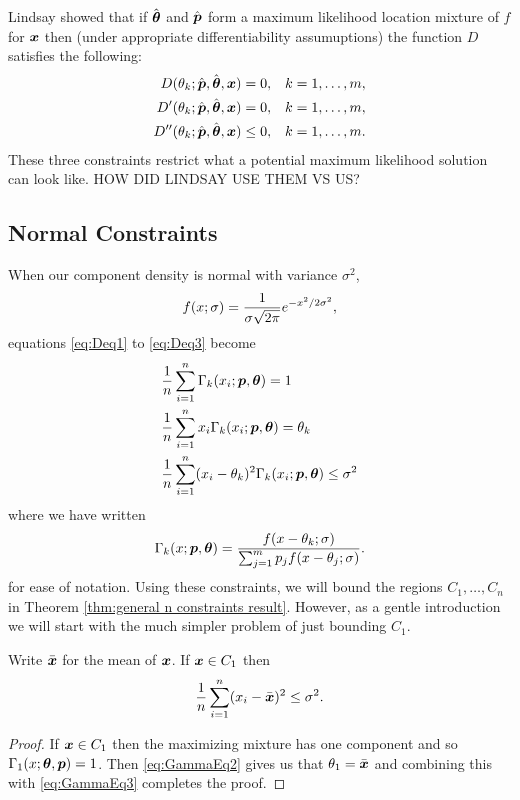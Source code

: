 		Lindsay showed that if $\hat{{\bm{{\theta}}}}$ and $\hat{{\bm{{p}}}}$ form a maximum likelihood location mixture of $f$ for ${\bm{{x}}}$ then (under appropriate differentiability assumuptions) the function $D$ satisfies the following:
		\begin{align}
			D(\theta_k;\hat{{\bm{{p}}}},\hat{{\bm{{\theta}}}},{\bm{{x}}}) &= 0, && k = 1,\dots,m,
			\label{eq:Deq1}\\
			D'(\theta_k;\hat{{\bm{{p}}}},\hat{{\bm{{\theta}}}},{\bm{{x}}}) &= 0, && k = 1,\dots,m,
			\label{eq:Deq2}\\
			D''(\theta_k;\hat{{\bm{{p}}}},\hat{{\bm{{\theta}}}},{\bm{{x}}}) &\leq 0, && k = 1,\dots,m.
			\label{eq:Deq3}
		\end{align}
		These three constraints restrict what a potential maximum likelihood solution can look like.
		HOW DID LINDSAY USE THEM VS US?

	\subsection{Normal Constraints}
		When our component density is normal with variance $\sigma^2$,
		\begin{equation}
			f(x;\sigma) = \frac{1}{\sigma \sqrt{2\pi}} e^{-x^2/2\sigma^2},
		\end{equation}
		equations \eqref{eq:Deq1} to \eqref{eq:Deq3} become
		\begin{align}
			&\frac{1}{n} \sum_{i=1}^n \Gamma_k(x_i;{\bm{{p}}},{\bm{{\theta}}}) = 1 \label{eq:GammaEq1}\\
			&\frac{1}{n} \sum_{i=1}^n x_i \Gamma_k(x_i;{\bm{{p}}},{\bm{{\theta}}}) = \theta_k \label{eq:GammaEq2}\\
			&\frac{1}{n} \sum_{i=1}^n (x_i - \theta_k)^2 \Gamma_k(x_i;{\bm{{p}}},{\bm{{\theta}}}) \leq \sigma^2
			\label{eq:GammaEq3}
		\end{align}
		where we have written
		\begin{equation}
			\Gamma_k(x;{\bm{{p}}},{\bm{{\theta}}}) = \frac{f(x - \theta_k;\sigma)}{\sum_{j=1}^m p_j f(x - \theta_j;\sigma)}.
		\end{equation}
		for ease of notation. Using these constraints, we will bound the regions
		$C_1, \dots, C_n$ in Theorem \ref{thm:general n constraints result}. However, as a gentle introduction we will start with the much simpler problem of just bounding $C_1$.

		\begin{theorem}
			\label{thm:general n C1 bound}
			Write $\bar{{\bm{{x}}}}$ for the mean of ${\bm{{x}}}$. If ${\bm{{x}}} \in C_1$ then 
			\begin{equation}
				\frac{1}{n} \sum_{i=1}^n (x_i - \bar{{\bm{{x}}}})^2 \leq \sigma^2.
			\end{equation}
		\end{theorem}
		\begin{proof}
			If ${\bm{{x}}} \in C_1$ then the maximizing mixture has one component and so $\Gamma_1(x; {\bm{{\theta}}}, {\bm{{p}}}) = 1$. Then \eqref{eq:GammaEq2} gives us that $\theta_1 = \bar{{\bm{{x}}}}$ and combining this with \eqref{eq:GammaEq3} completes the proof.
		\end{proof}

